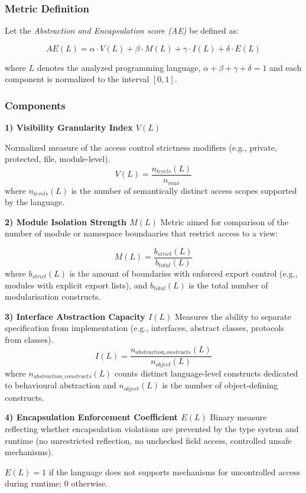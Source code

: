 \subsubsection{Metric Definition}

Let the \textit{Abstraction and Encapsulation score (AE)} be defined as:

\[
    AE(L) = 
    \alpha \cdot V(L) + 
    \beta \cdot M(L) + 
    \gamma \cdot I(L) + 
    \delta \cdot E(L)
\]

where $L$ denotes the analyzed programming language, $\alpha + \beta + \gamma + \delta = 1$ and each component is normalized to the interval $[0,1]$.

\subsubsection{Components}

\textbf{1) Visibility Granularity Index $V(L)$}

Normalized measure of the access control strictness modifiers (e.g., private, protected, file, module-level).
\[
    V(L) = \frac{n_{levels}(L)}{n_{max}}
\]
where $n_{levels}(L)$ is the number of semantically distinct access scopes supported by the language.


\textbf{2) Module Isolation Strength $M(L)$}
Metric aimed for comparison of the number of module or namespace boundaaries that restrict access to a view:

\[
    M(L) = \frac{b_{strict}(L)}{b_{total}(L)}
\]
where $b_{strict}(L)$ is the amount of boundaries with enforced export control (e.g., modules with explicit export lists), and $b_{total}(L)$ is the total number of modularisation constructs.


\textbf{3) Interface Abstraction Capacity $I(L)$}
Measures the ability to separate specification from implementation (e.g., interfaces, abstract classes, protocols from classes).
\[
    I(L) = \frac{n_{abstraction_constructs}(L)}{n_{object}(L)}
\]
where $n_{abstraction\_constructs}(L)$ counts distinct language-level constructs dedicated to behavioural abstraction and $n_{object}(L)$ is the number of object-defining constructs.


\textbf{4) Encapsulation Enforcement Coefficient $E(L)$}
Binary measure reflecting whether encapsulation violations are prevented by the type system and runtime (no unrestricted reflection, no unchecked field access, controlled unsafe mechanisms).

$E(L) = 1$ if the language does not supports mechanisms for uncontrolled access during runtime; $0$ otherwise.


